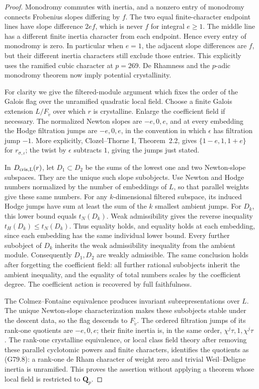 \begin{proof}
Monodromy commutes with inertia, and a nonzero entry of
monodromy connects Frobenius slopes differing by \(f\).
The two equal finite-character endpoint lines have slope
difference \(2ef\), which is never \(f\) for integral
\(e\ge1\).  The middle line has a different finite inertia
character from each endpoint.
Hence every entry of monodromy is zero.
In particular when \(e=1\), the adjacent slope differences
are \(f\), but their different inertia characters still
exclude those entries.  This explicitly uses the ramified
cubic character at \(p=269\).
De Rhamness and the \(p\)-adic monodromy theorem now imply
potential crystallinity.

For clarity we give the filtered-module argument which
fixes the order of the Galois flag over the unramified
quadratic local field.  Choose a finite Galois extension
\(L/F_{\widetilde v}\) over which \(r\) is crystalline.
Enlarge the coefficient field if necessary.
The normalized Newton slopes are \(-e,0,e\), and at every
embedding the Hodge filtration jumps are \(-e,0,e\), in
the convention in which \(\epsilon\) has filtration jump
\(-1\).
More explicitly, Clozel--Thorne I, Theorem~2.2, gives
\(\{1-e,1,1+e\}\) for \(r_{\sigma,\iota}\); the twist
by \(\epsilon\) subtracts \(1\), giving the jumps just stated.

In \(D_{\rm cris,L}(r)\), let \(D_1\subset D_2\) be the
sums of the lowest one and two Newton-slope subspaces.
They are the unique such slope subobjects.
Use Newton and Hodge numbers normalized by the number
of embeddings of \(L\), so that parallel weights give
these same numbers.  For any \(k\)-dimensional filtered
subspace, its induced Hodge jumps have sum at least the
sum of the \(k\) smallest ambient jumps.
For \(D_k\), this lower bound equals \(t_N(D_k)\).
Weak admissibility gives the reverse inequality
\(t_H(D_k)\le t_N(D_k)\).  Thus equality holds, and
equality holds at each embedding, since each embedding
has the same individual lower bound.
Every further subobject of \(D_k\) inherits the weak
admissibility inequality from the ambient module.
Consequently \(D_1,D_2\) are weakly admissible.
The same conclusion holds after forgetting the coefficient field:
all further rational subobjects inherit the ambient inequality,
and the equality of total numbers scales by the coefficient degree.
The coefficient action is recovered by full faithfulness.

The Colmez--Fontaine equivalence produces invariant
subrepresentations over \(L\).
The unique Newton-slope characterization makes these
subobjects stable under the descent data, so the flag
descends to \(F_{\widetilde v}\).
The ordered filtration jumps of its rank-one quotients
are \(-e,0,e\); their finite inertia is, in the same order,
\(\chi^j\tau,1,\chi^j\tau\).
The rank-one crystalline equivalence, or local class
field theory after removing these parallel cyclotomic
powers and finite characters, identifies the quotients
as (G79.8): a rank-one de Rham character of weight zero
and trivial Weil--Deligne inertia is unramified.
This proves the assertion without applying a theorem
whose local field is restricted to \(\mathbf Q_p\).
\end{proof}

